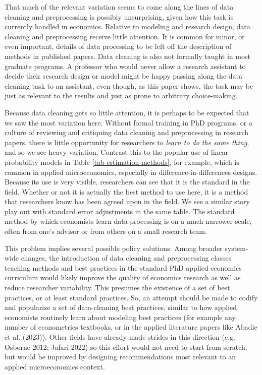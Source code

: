 \documentclass[
  letterpaper,
  DIV=11,
  numbers=noendperiod]{scrartcl}
\begin{document}
That much of the relevant variation seems to come along the lines of
data cleaning and preprocessing is possibly unsurprising, given how this
task is currently handled in economics. Relative to modeling and
research design, data cleaning and preprocessing receive little
attention. It is common for minor, or even important, details of data
processing to be left off the description of methods in published
papers. Data cleaning is also not formally taught in most graduate
programs. A professor who would never allow a research assistant to
decide their research design or model might be happy passing along the
data cleaning task to an assistant, even though, as this paper shows,
the task may be just as relevant to the results and just as prone to
arbitrary choice-making.

Because data cleaning gets so little attention, it is perhaps to be
expected that we saw the most variation here. Without formal training in
PhD programs, or a culture of reviewing and critiquing data cleaning and
preprocessing in research papers, there is little opportunity for
researchers to \emph{learn to do the same thing}, and so we see heavy
variation. Contrast this to the popular use of linear probability models
in Table \ref{tab-estimation-methods}, for example, which is common in
applied microeconomics, especially in difference-in-differences designs.
Because its use is very visible, researchers can see that it is the
standard in the field. Whether or not it is actually the best method to
use here, it is a method that researchers know has been agreed upon in
the field. We see a similar story play out with standard error
adjustments in the same table. The standard method by which economists
learn data processing is on a much narrower scale, often from one's
advisor or from others on a small research team.

This problem implies several possible policy solutions. Among broader
system-wide changes, the introduction of data cleaning and preprocessing
classes teaching methods and best practices in the standard PhD applied
economics curriculum would likely improve the quality of economics
research as well as reduce researcher variability. This presumes the
existence of a set of best practices, or at least standard practices.
So, an attempt should be made to codify and popularize a set of
data-cleaning best practices, similar to how applied economists
routinely learn about modeling best practices (for example any number of
econometrics textbooks, or in the applied literature papers like Abadie
et al. (2023)). Other fields have already made strides in this direction
(e.g. Osborne 2012; Jafari 2022) so this effort would not need to start
from scratch, but would be improved by designing recommendations most
relevant to an applied microeconomics context.
\end{document}
